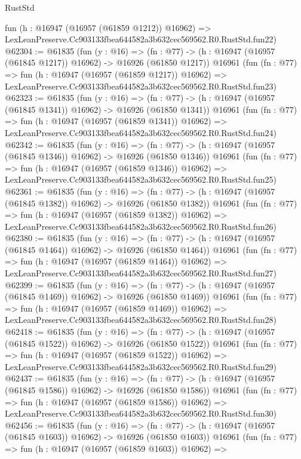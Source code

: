 \begin{lexlean}{RustStd}
\begin{coremodule}
    fun (h : @16947 (@16957 (@61859 @1212)) @16962) =>
    LexLeanPreserve.Cc903133fbea644582a3b632cec569562.R0.RustStd.fun22)
@62304 := @61835
    (fun (y : @16) =>
    (fn : @77) -> (h : @16947 (@16957 (@61845 @1217)) @16962) -> @16926 (@61850 @1217))
    @16961
    (fun (fn : @77) =>
    fun (h : @16947 (@16957 (@61859 @1217)) @16962) =>
    LexLeanPreserve.Cc903133fbea644582a3b632cec569562.R0.RustStd.fun23)
@62323 := @61835
    (fun (y : @16) =>
    (fn : @77) -> (h : @16947 (@16957 (@61845 @1341)) @16962) -> @16926 (@61850 @1341))
    @16961
    (fun (fn : @77) =>
    fun (h : @16947 (@16957 (@61859 @1341)) @16962) =>
    LexLeanPreserve.Cc903133fbea644582a3b632cec569562.R0.RustStd.fun24)
@62342 := @61835
    (fun (y : @16) =>
    (fn : @77) -> (h : @16947 (@16957 (@61845 @1346)) @16962) -> @16926 (@61850 @1346))
    @16961
    (fun (fn : @77) =>
    fun (h : @16947 (@16957 (@61859 @1346)) @16962) =>
    LexLeanPreserve.Cc903133fbea644582a3b632cec569562.R0.RustStd.fun25)
@62361 := @61835
    (fun (y : @16) =>
    (fn : @77) -> (h : @16947 (@16957 (@61845 @1382)) @16962) -> @16926 (@61850 @1382))
    @16961
    (fun (fn : @77) =>
    fun (h : @16947 (@16957 (@61859 @1382)) @16962) =>
    LexLeanPreserve.Cc903133fbea644582a3b632cec569562.R0.RustStd.fun26)
@62380 := @61835
    (fun (y : @16) =>
    (fn : @77) -> (h : @16947 (@16957 (@61845 @1464)) @16962) -> @16926 (@61850 @1464))
    @16961
    (fun (fn : @77) =>
    fun (h : @16947 (@16957 (@61859 @1464)) @16962) =>
    LexLeanPreserve.Cc903133fbea644582a3b632cec569562.R0.RustStd.fun27)
@62399 := @61835
    (fun (y : @16) =>
    (fn : @77) -> (h : @16947 (@16957 (@61845 @1469)) @16962) -> @16926 (@61850 @1469))
    @16961
    (fun (fn : @77) =>
    fun (h : @16947 (@16957 (@61859 @1469)) @16962) =>
    LexLeanPreserve.Cc903133fbea644582a3b632cec569562.R0.RustStd.fun28)
@62418 := @61835
    (fun (y : @16) =>
    (fn : @77) -> (h : @16947 (@16957 (@61845 @1522)) @16962) -> @16926 (@61850 @1522))
    @16961
    (fun (fn : @77) =>
    fun (h : @16947 (@16957 (@61859 @1522)) @16962) =>
    LexLeanPreserve.Cc903133fbea644582a3b632cec569562.R0.RustStd.fun29)
@62437 := @61835
    (fun (y : @16) =>
    (fn : @77) -> (h : @16947 (@16957 (@61845 @1586)) @16962) -> @16926 (@61850 @1586))
    @16961
    (fun (fn : @77) =>
    fun (h : @16947 (@16957 (@61859 @1586)) @16962) =>
    LexLeanPreserve.Cc903133fbea644582a3b632cec569562.R0.RustStd.fun30)
@62456 := @61835
    (fun (y : @16) =>
    (fn : @77) -> (h : @16947 (@16957 (@61845 @1603)) @16962) -> @16926 (@61850 @1603))
    @16961
    (fun (fn : @77) =>
    fun (h : @16947 (@16957 (@61859 @1603)) @16962) =>

\end{coremodule}
\end{lexlean}
